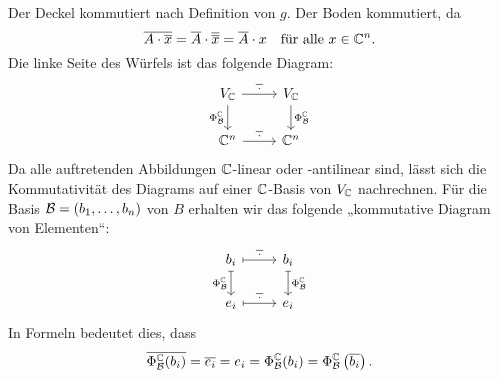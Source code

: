 \documentclass[a4paper,10pt]{article}
\begin{document}
Der Deckel kommutiert nach Definition von $g$.
Der Boden kommutiert, da
\[
    \overline{A \cdot \overline{x}}
  = \overline{A} \cdot \overline{\overline{x}}
  = \overline{A} \cdot x
  \quad
  \text{für alle $x \in \mathbb{C}^n$}.
\]
Die linke Seite des Würfels ist das folgende Diagram:
\[
  \begin{tikzcd}
      V_\Cbb
      \arrow[r, "\overline{\,\cdot\,}"]
      \arrow[d, "\Phi^\Cbb_\mc{B}"']
    & V_\Cbb
      \arrow[d, "\Phi^\Cbb_\mc{B}"]
    \\
      \Cbb^n
      \arrow[r, "\overline{\,\cdot\,}"]
    & \Cbb^n
  \end{tikzcd}
\]
Da alle auftretenden Abbildungen $\mathbb{C}$-linear oder -antilinear sind, lässt sich die Kommutativität des Diagrams auf einer $\mathbb{C}$-Basis von $V_{\mathbb{C}}$ nachrechnen.
Für die Basis $\mathcal{B} = (b_1, \dotsc, b_n)$ von $B$ erhalten wir das folgende „kommutative Diagram von Elementen“:
\[
  \begin{tikzcd}
      b_i
      \arrow[r, maps to, "\overline{\,\cdot\,}"]
      \arrow[d, maps to, "\Phi^\Cbb_\mc{B}"']
    & b_i
      \arrow[d, maps to, "\Phi^\Cbb_\mc{B}"]
    \\
      e_i
      \arrow[r, maps to, "\overline{\,\cdot\,}"]
    & e_i
  \end{tikzcd}
\]
In Formeln bedeutet dies, dass
\[
    \overline{\Phi^{\mathbb{C}}_{\mathcal{B}}(b_i)}
  = \overline{e_i}
  = e_i
  = \Phi^{\mathbb{C}}_{\mathcal{B}}(b_i)
  = \Phi^{\mathbb{C}}_{\mathcal{B}}\left( \overline{b_i} \right).
\]
\end{document}
